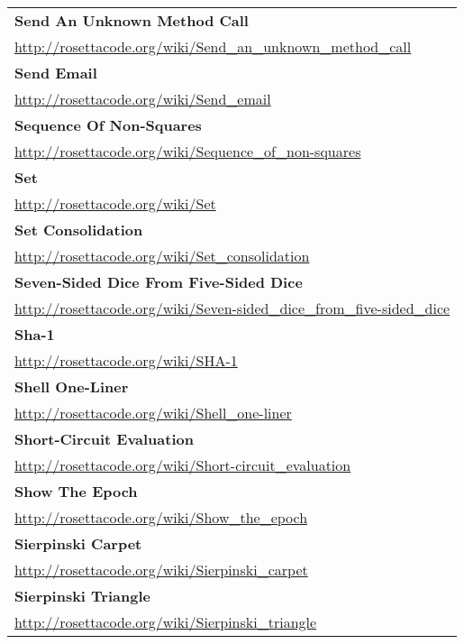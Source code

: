 \begin{longtable}{l}
\textbf{
Send An Unknown Method Call } \\ \href{http://rosettacode.org/wiki/Send\_an\_unknown\_method\_call}{http://rosettacode.org/wiki/Send\_an\_unknown\_method\_call} \\
\textbf{Send Email } \\ \href{http://rosettacode.org/wiki/Send\_email}{http://rosettacode.org/wiki/Send\_email} \\
\textbf{Sequence Of Non-Squares } \\ \href{http://rosettacode.org/wiki/Sequence\_of\_non-squares}{http://rosettacode.org/wiki/Sequence\_of\_non-squares} \\
\textbf{
Set } \\ \href{http://rosettacode.org/wiki/Set}{http://rosettacode.org/wiki/Set} \\
\textbf{Set Consolidation } \\ \href{http://rosettacode.org/wiki/Set\_consolidation}{http://rosettacode.org/wiki/Set\_consolidation} \\
\textbf{Seven-Sided Dice From Five-Sided Dice } \\ \href{http://rosettacode.org/wiki/Seven-sided\_dice\_from\_five-sided\_dice}{http://rosettacode.org/wiki/Seven-sided\_dice\_from\_five-sided\_dice} \\
\textbf{
Sha-1 } \\ \href{http://rosettacode.org/wiki/SHA-1}{http://rosettacode.org/wiki/SHA-1} \\
\textbf{Shell One-Liner } \\ \href{http://rosettacode.org/wiki/Shell\_one-liner}{http://rosettacode.org/wiki/Shell\_one-liner} \\
\textbf{Short-Circuit Evaluation } \\ \href{http://rosettacode.org/wiki/Short-circuit\_evaluation}{http://rosettacode.org/wiki/Short-circuit\_evaluation} \\
\textbf{Show The Epoch } \\ \href{http://rosettacode.org/wiki/Show\_the\_epoch}{http://rosettacode.org/wiki/Show\_the\_epoch} \\
\textbf{
Sierpinski Carpet } \\ \href{http://rosettacode.org/wiki/Sierpinski\_carpet}{http://rosettacode.org/wiki/Sierpinski\_carpet} \\
\textbf{Sierpinski Triangle } \\ \href{http://rosettacode.org/wiki/Sierpinski\_triangle}{http://rosettacode.org/wiki/Sierpinski\_triangle} \\

\end{longtable}
